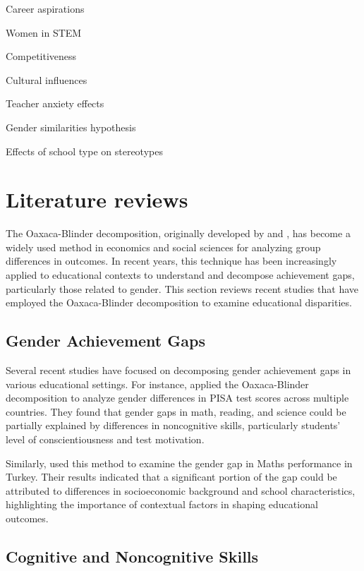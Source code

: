 \documentclass[12pt,a4paper,onecolumn]{article}
\numberwithin{equation}{section}
\begin{document}
Career aspirations \textcite{eccles1994,frome2006} 

Women in STEM \textcite{sax2008} 

Competitiveness \textcite{niederle2010} 

Cultural influences \textcite{guiso2008} 

Teacher anxiety effects \textcite{beilock2010} 

Gender similarities hypothesis \textcite{hyde2008} 

Effects of school type on stereotypes \textcite{blakemore2003} 

\section{Literature reviews}

The Oaxaca-Blinder decomposition, originally developed by \textcite{blinder1973} and  \parencite{oaxaca1973}, has become a widely used method in economics and social sciences for analyzing group differences in outcomes. In recent years, this technique has been increasingly applied to educational contexts to understand and decompose achievement gaps, particularly those related to gender. This section reviews recent studies that have employed the Oaxaca-Blinder decomposition to examine educational disparities.

\subsection{Gender Achievement Gaps}

Several recent studies have focused on decomposing gender achievement gaps in various educational settings. For instance, \parencite{golsteyn2014} applied the Oaxaca-Blinder decomposition to analyze gender differences in PISA test scores across multiple countries. They found that gender gaps in math, reading, and science could be partially explained by differences in noncognitive skills, particularly students' level of conscientiousness and test motivation.

Similarly, \parencite{gevrek2014} used this method to examine the gender gap in Maths performance in Turkey. Their results indicated that a significant portion of the gap could be attributed to differences in socioeconomic background and school characteristics, highlighting the importance of contextual factors in shaping educational outcomes.

\subsection{Cognitive and Noncognitive Skills}
\end{document}
